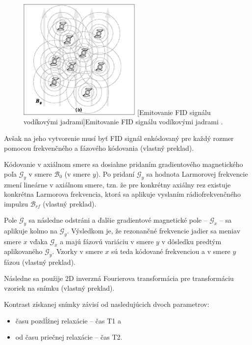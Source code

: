 \begin {figure}[H]
        \centering
        \includegraphics[height=6cm]{media/hydrogen/hydrogen_emitting_rf.png}
        \captionsetup{justification=centering}
        [Emitovanie FID signálu vodíkovými jadrami]{Emitovanie FID signálu vodíkovými jadrami \cite{basic_principles_of_mri}.}
\end {figure}

Avšak na jeho vytvorenie musí byť FID signál enkódovaný pre každý rozmer pomocou frekvenčného a fázového kódovania \cite{basic_principles_of_mri} (vlastný preklad).

Kódovanie v axiálnom smere sa dosiahne pridaním gradientového magnetického poľa $\mathcal{G}_{y}$ v smere $\mathcal{B}_{0}$ (v smere $y$). Po pridaní $\mathcal{G}_{y}$ sa hodnota Larmorovej frekvencie zmení lineárne v axiálnom smere, tzn. že pre konkrétny axiálny rez existuje konkrétna Larmorova frekvencia, ktorá sa aplikuje vyslaním rádiofrekvenčného impulzu $\mathcal{B}_{rf}$ \cite{basic_principles_of_mri} (vlastný preklad).

Pole $\mathcal{G}_{y}$ sa následne odstráni a ďalšie gradientové magnetické pole -- $\mathcal{G}_{x}$ -- sa aplikuje kolmo na $\mathcal{G}_{y}$. Výsledkom je, že rezonančné frekvencie jadier sa menia\newline v smere $x$ vďaka $\mathcal{G}_{x}$ a majú fázovú variáciu v smere $y$ v dôsledku predtým aplikovaného $\mathcal{G}_{y}$. Vzorky v smere $x$ sú teda kódované frekvenciou a v smere $y$ fázou \cite{basic_principles_of_mri} (vlastný preklad).

Následne sa použije 2D inverzná Fourierova transformácia pre transformáciu vzoriek na snímku \cite{basic_principles_of_mri} (vlastný preklad).\clearpage

Kontrast získanej snímky závisí od nasledujúcich dvoch parametrov:

\begin {itemize}
\item {času pozdĺžnej relaxácie -- čas T1 a}
\item {od času priečnej relaxácie -- čas T2.}
\end {itemize}

